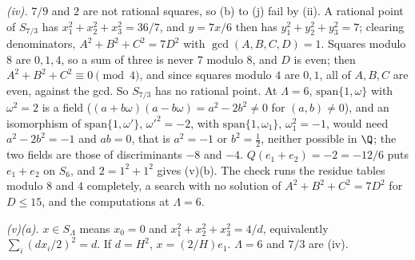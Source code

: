 \emph{(iv).} $7/9$ and $2$ are not rational squares, so (b) to (j) fail by (ii). A rational point of $S_{7/3}$ has $x_{1}^{2} + x_{2}^{2} + x_{3}^{2} = 36/7$, and $y = 7x/6$ then has $y_{1}^{2} + y_{2}^{2} + y_{3}^{2} = 7$; clearing denominators, $A^{2} + B^{2} + C^{2} = 7D^{2}$ with $\gcd(A, B, C, D) = 1$. Squares modulo $8$ are $0, 1, 4$, so a sum of three is never $7$ modulo $8$, and $D$ is even; then $A^{2} + B^{2} + C^{2} \equiv 0 \pmod 4$, and since squares modulo $4$ are $0, 1$, all of $A, B, C$ are even, against the gcd. So $S_{7/3}$ has no rational point. At $\Lambda = 6$, $\mathrm{span}\{1, \omega\}$ with $\omega^{2} = 2$ is a field ($(a + b\omega)(a - b\omega) = a^{2} - 2b^{2} \neq 0$ for $(a, b) \neq 0$), and an isomorphism of $\mathrm{span}\{1, \omega'\}$, $\omega'^{2} = -2$, with $\mathrm{span}\{1, \omega_{1}\}$, $\omega_{1}^{2} = -1$, would need $a^{2} - 2b^{2} = -1$ and $ab = 0$, that is $a^{2} = -1$ or $b^{2} = \tfrac12$, neither possible in $\Q$; the two fields are those of discriminants $-8$ and $-4$. $Q(e_{1} + e_{2}) = -2 = -12/6$ puts $e_{1} + e_{2}$ on $S_{6}$, and $2 = 1^{2} + 1^{2}$ gives (v)(b). The check runs the residue tables modulo $8$ and $4$ completely, a search with no solution of $A^{2} + B^{2} + C^{2} = 7D^{2}$ for $D \le 15$, and the computations at $\Lambda = 6$.

\emph{(v)(a).} $x \in S_{\Lambda}$ means $x_{0} = 0$ and $x_{1}^{2} + x_{2}^{2} + x_{3}^{2} = 4/d$, equivalently $\sum_{i}(dx_{i}/2)^{2} = d$. If $d = H^{2}$, $x = (2/H)e_{1}$. $\Lambda = 6$ and $7/3$ are (iv).

